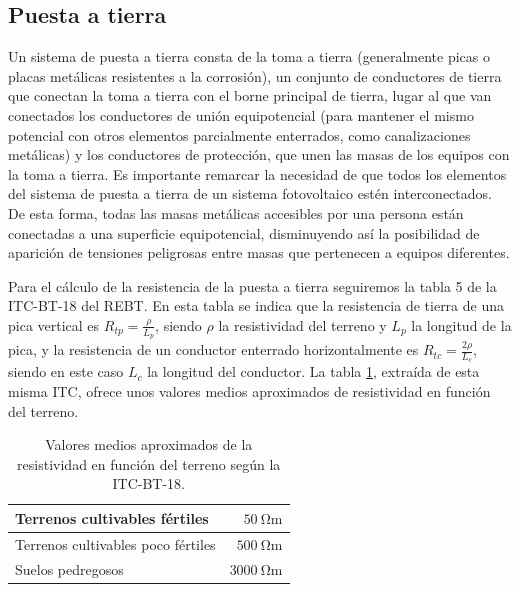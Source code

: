 \subsection{Puesta a tierra}
\label{sec:puesta_tierra}
Un sistema de puesta a tierra consta de la toma a tierra (generalmente
picas o placas metálicas resistentes a la corrosión), un conjunto de
conductores de tierra que conectan la toma a tierra con el borne
principal de tierra, lugar al que van conectados los conductores de
unión equipotencial (para mantener el mismo potencial con otros
elementos parcialmente enterrados, como canalizaciones metálicas) y
los conductores de protección, que unen las masas de los equipos con
la toma a tierra. Es importante remarcar la necesidad de que todos los
elementos del sistema de puesta a tierra de un sistema fotovoltaico
estén interconectados. De esta forma, todas las masas metálicas
accesibles por una persona están conectadas a una superficie
equipotencial, disminuyendo así la posibilidad de aparición de
tensiones peligrosas entre masas que pertenecen a equipos diferentes.

Para el cálculo de la resistencia de la puesta a tierra seguiremos la
tabla 5 de la ITC-BT-18 del REBT. En esta tabla se indica que la
resistencia de tierra de una pica vertical es
$R_{tp}=\frac{\rho}{L_{p}}$, siendo $\rho$ la resistividad del terreno
y $L_{p}$ la longitud de la pica, y la resistencia de un conductor
enterrado horizontalmente es $R_{tc}=\frac{2\rho}{L_{c}}$, siendo en
este caso $L_c$ la longitud del conductor. La tabla
\ref{tab:ValoresResistividad}, extraída de esta misma ITC, ofrece unos
valores medios aproximados de resistividad en función del terreno.

%
\begin{table}
\caption{Valores medios aproximados de la resistividad en función del terreno
según la ITC-BT-18.\label{tab:ValoresResistividad}}

\begin{tabular}{lr}
\toprule 
Terrenos cultivables fértiles & $\SI{50}{\ohm\meter}$\tabularnewline
\midrule 
Terrenos cultivables poco fértiles & $\SI{500}{\ohm\meter}$\tabularnewline
\midrule 
Suelos pedregosos & $\SI{3000}{\ohm\meter}$\tabularnewline
\bottomrule
\end{tabular}
\end{table}

